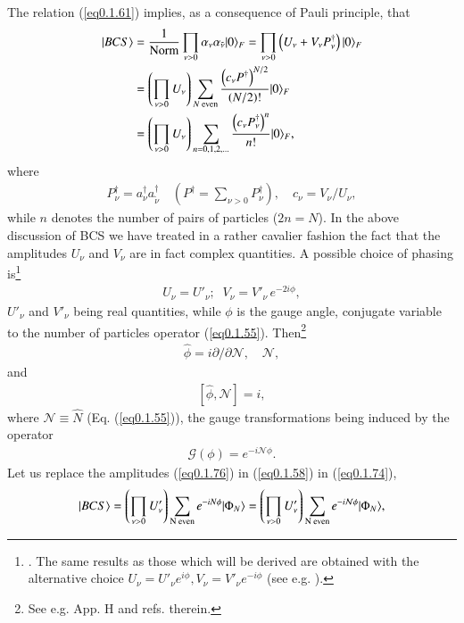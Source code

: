 The relation (\ref{eq0.1.61}) implies, as a consequence of Pauli principle, that 
\begin{align}\label{eq0.1.74}
\nonumber |{BCS} \rangle&=\frac{1}{\text{Norm}}\prod_{\nu>0}\alpha_\nu\alpha_{\tilde\nu}|{0} \rangle_F=\prod_{\nu>0}\left(U_\nu+V_\nu P^\dagger_\nu\right)|{0} \rangle_F\\
\nonumber&=\left(\prod_{\nu>0}U_{\nu}\right)\sum_{N\text{ even}} \frac{\left(c_\nu P^\dagger\right)^{N/2}}{(N/2)!}|{0} \rangle_F\\
&=\left(\prod_{\nu>0}U_\nu\right)\sum_{n=0,1,2,\dots}\frac{\left(c_\nu P^\dagger_\nu\right)^n}{n!}|{0} \rangle_F,
\end{align}
 where
\begin{align}\label{eq0.1.75}
P^\dagger_\nu=a_\nu^\dagger a^\dagger_{\tilde \nu}\quad \left(P^\dagger=\sum_{\nu>0}P^\dagger_\nu\right), \quad c_\nu=V_\nu/U_\nu,
\end{align}
while $n$ denotes the number of pairs of particles ($2n=N$).
 In the above discussion of BCS we have treated in a rather cavalier fashion the fact that the amplitudes $U_\nu$ and $V_\nu$ are in fact complex quantities. A possible choice of phasing is\footnote{\cite{Schrieffer:73}. The same results as those which will be derived are obtained with the alternative choice $U_\nu=U'_\nu e^{i\phi},V_\nu=V'_\nu e^{-i\phi}$ (see e.g. \cite{Potel:13b}).} 
\begin{align}\label{eq0.1.76}
U_\nu=U'_\nu;\;\;V_\nu=V'_\nu\, e^{-2i\phi},
\end{align}
$U'_\nu$ and $V'_\nu$ being real quantities, while $\phi$ is the gauge angle, conjugate variable to the number of particles operator (\ref{eq0.1.55}). Then\footnote{See e.g. \cite{Brink:05} App. H and refs. therein.}
\begin{align}\label{eq0.1.77}
\hat\phi=i\partial/\partial \mathcal N,\quad \mathcal N,
\end{align}
and
\begin{align}\label{eq0.1.78}
\left[\hat \phi,\mathcal N\right]=i,
\end{align}
where $\mathcal N\equiv\hat N$ (Eq. (\ref{eq0.1.55})), the gauge transformations being induced by the operator 
\begin{align}\label{eq0.1.79}
\mathcal G(\phi)=e^{-i\mathcal N\phi}.
\end{align}
Let us replace the amplitudes (\ref{eq0.1.76}) in (\ref{eq0.1.58}) in (\ref{eq0.1.74}),
\begin{align}\label{eq0.1.80}
|{BCS} \rangle=\left(\prod_{\nu>0}U'_\nu\right)\sum_{\text{N even}}e^{-iN\phi}|{\Phi_{N}} \rangle=\left(\prod_{\nu>0}U'_\nu\right)\sum_{\text{N even}}e^{-i\mathcal N\phi}|{\Phi_{N}} \rangle,
\end{align}
